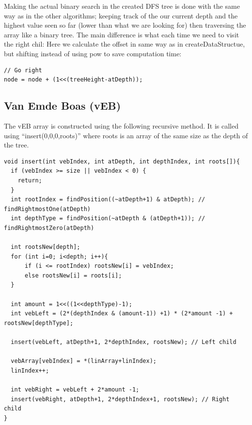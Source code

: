 Making the actual binary search in the created DFS tree is done with the same way as in the other algorithms; keeping track of the our current depth and the highest value seen so far (lower than what we are looking for) then traversing the array like a binary tree. The main difference is what each time we need to visit the right chil: Here we calculate the offset in same way as in createDataStructue, but shifting instead of using pow to save computation time:
\begin{verbatim}
// Go right
node = node + (1<<(treeHeight-atDepth));
\end{verbatim}



\subsection{Van Emde Boas (vEB)}

The vEB array is constructed using the following recursive method. It is called using ``insert(0,0,0,roots)'' where roots is an array of the same size as the depth of the tree.

\begin{verbatim}
void insert(int vebIndex, int atDepth, int depthIndex, int roots[]){
  if (vebIndex >= size || vebIndex < 0) {
    return;
  }
  int rootIndex = findPosition((~atDepth+1) & atDepth); // findRightmostOne(atDepth)
  int depthType = findPosition(~atDepth & (atDepth+1)); // findRightmostZero(atDepth)
    
  int rootsNew[depth];
  for (int i=0; i<depth; i++){
      if (i <= rootIndex) rootsNew[i] = vebIndex;
      else rootsNew[i] = roots[i];
  }

  int amount = 1<<((1<<depthType)-1);
  int vebLeft = (2*(depthIndex & (amount-1)) +1) * (2*amount -1) + rootsNew[depthType];

  insert(vebLeft, atDepth+1, 2*depthIndex, rootsNew); // Left child
    
  vebArray[vebIndex] = *(linArray+linIndex);
  linIndex++;

  int vebRight = vebLeft + 2*amount -1;
  insert(vebRight, atDepth+1, 2*depthIndex+1, rootsNew); // Right child
}
\end{verbatim}


